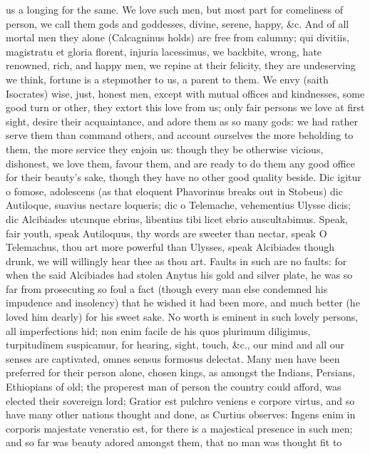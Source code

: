 {us a longing for the same. We love such men, but most part for
comeliness of person, we call them gods and goddesses, divine, serene,
happy, \&c. And of all mortal men they alone (Calcagninus holds)
are free from calumny; qui divitiis, magistratu et gloria florent,
injuria lacessimus, we backbite, wrong, hate renowned, rich, and happy
men, we repine at their felicity, they are undeserving we think,
fortune is a stepmother to us, a parent to them. We envy (saith
Isocrates) wise, just, honest men, except with mutual offices and
kindnesses, some good turn or other, they extort this love from us;
only fair persons we love at first sight, desire their acquaintance,
and adore them as so many gods: we had rather serve them than command
others, and account ourselves the more beholding to them, the more
service they enjoin us: though they be otherwise vicious, dishonest, we
love them, favour them, and are ready to do them any good office for
their beauty's sake, though they have no other good quality
beside. Dic igitur o fomose, adolescens (as that eloquent Phavorinus
breaks out in Stobeus) dic Autiloque, suavius nectare loqueris;
dic o Telemache, vehementius Ulysse dicis; dic Alcibiades utcunque
ebrius, libentius tibi licet ebrio auscultabimus. Speak, fair youth,
speak Autiloquus, thy words are sweeter than nectar, speak O
Telemachus, thou art more powerful than Ulysses, speak Alcibiades
though drunk, we will willingly hear thee as thou art. Faults in such
are no faults: for when the said Alcibiades had stolen Anytus his gold
and silver plate, he was so far from prosecuting so foul a fact (though
every man else condemned his impudence and insolency) that he wished it
had been more, and much better (he loved him dearly) for his sweet
sake. No worth is eminent in such lovely persons, all imperfections
hid; non enim facile de his quos plurimum diligimus, turpitudinem
suspicamur, for hearing, sight, touch, \&c., our mind and all our senses
are captivated, omnes sensus formosus delectat. Many men have been
preferred for their person alone, chosen kings, as amongst the Indians,
Persians, Ethiopians of old; the properest man of person the country
could afford, was elected their sovereign lord; Gratior est pulchro
veniens e corpore virtus, and so have many other nations thought
and done, as Curtius observes: Ingens enim in corporis majestate
veneratio est, for there is a majestical presence in such men; and so
far was beauty adored amongst them, that no man was thought fit to
}
